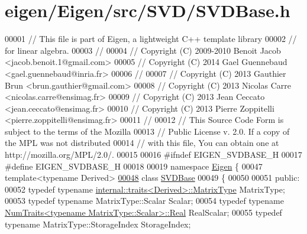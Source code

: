 \hypertarget{eigen_2_eigen_2src_2_s_v_d_2_s_v_d_base_8h_source}{}\section{eigen/\+Eigen/src/\+S\+V\+D/\+S\+V\+D\+Base.h}
\label{eigen_2_eigen_2src_2_s_v_d_2_s_v_d_base_8h_source}

\begin{DoxyCode}
00001 \textcolor{comment}{// This file is part of Eigen, a lightweight C++ template library}
00002 \textcolor{comment}{// for linear algebra.}
00003 \textcolor{comment}{//}
00004 \textcolor{comment}{// Copyright (C) 2009-2010 Benoit Jacob <jacob.benoit.1@gmail.com>}
00005 \textcolor{comment}{// Copyright (C) 2014 Gael Guennebaud <gael.guennebaud@inria.fr>}
00006 \textcolor{comment}{//}
00007 \textcolor{comment}{// Copyright (C) 2013 Gauthier Brun <brun.gauthier@gmail.com>}
00008 \textcolor{comment}{// Copyright (C) 2013 Nicolas Carre <nicolas.carre@ensimag.fr>}
00009 \textcolor{comment}{// Copyright (C) 2013 Jean Ceccato <jean.ceccato@ensimag.fr>}
00010 \textcolor{comment}{// Copyright (C) 2013 Pierre Zoppitelli <pierre.zoppitelli@ensimag.fr>}
00011 \textcolor{comment}{//}
00012 \textcolor{comment}{// This Source Code Form is subject to the terms of the Mozilla}
00013 \textcolor{comment}{// Public License v. 2.0. If a copy of the MPL was not distributed}
00014 \textcolor{comment}{// with this file, You can obtain one at http://mozilla.org/MPL/2.0/.}
00015 
00016 \textcolor{preprocessor}{#ifndef EIGEN\_SVDBASE\_H}
00017 \textcolor{preprocessor}{#define EIGEN\_SVDBASE\_H}
00018 
00019 \textcolor{keyword}{namespace }\hyperlink{namespace_eigen}{Eigen} \{
00047 \textcolor{keyword}{template}<\textcolor{keyword}{typename} Derived>
\hyperlink{group___s_v_d___module}{00048} \textcolor{keyword}{class }\hyperlink{group___s_v_d___module_class_eigen_1_1_s_v_d_base}{SVDBase}
00049 \{
00050 
00051 \textcolor{keyword}{public}:
00052   \textcolor{keyword}{typedef} \textcolor{keyword}{typename} \hyperlink{struct_eigen_1_1internal_1_1traits}{internal::traits<Derived>::MatrixType} MatrixType;
00053   \textcolor{keyword}{typedef} \textcolor{keyword}{typename} MatrixType::Scalar Scalar;
00054   \textcolor{keyword}{typedef} \textcolor{keyword}{typename} \hyperlink{group___core___module_struct_eigen_1_1_num_traits}{NumTraits<typename MatrixType::Scalar>::Real}
       RealScalar;
00055   \textcolor{keyword}{typedef} \textcolor{keyword}{typename} MatrixType::StorageIndex StorageIndex;

\end{DoxyCode}
